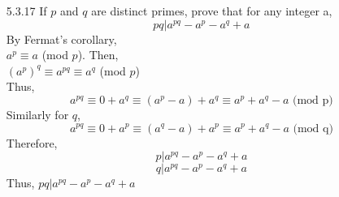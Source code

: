 \documentclass[12pt]{article}
\begin{document}
\begin{enumerate}
	\item[5.3.17] If $ p $ and $ q $ are distinct primes, prove that for any integer a,
		\[pq|a^{pq}-a^p-a^q+a\]
		By Fermat's corollary,\\
		 $ a^p\equiv a  $ (mod $ p $). Then,\\
		 $(a^p)^q \equiv a^{pq}\equiv a^q $ (mod $ p $)\\
		 Thus, 
		 \[a^{pq}\equiv0+a^q\equiv(a^p-a)+a^q\equiv a^p+a^q-a \text{ (mod p)}\]
		 Similarly for $ q $,
		 \[a^{pq}\equiv0+a^p\equiv(a^q-a)+a^p\equiv a^p+a^q-a \text{ (mod q)}\]
		 Therefore, 
		 	\[p|a^{pq}-a^p-a^q+a \]
		 	\[q|a^{pq}-a^p-a^q+a \]
		 Thus, $pq|a^{pq}-a^p-a^q+a$
\end{enumerate}
\end{document}

